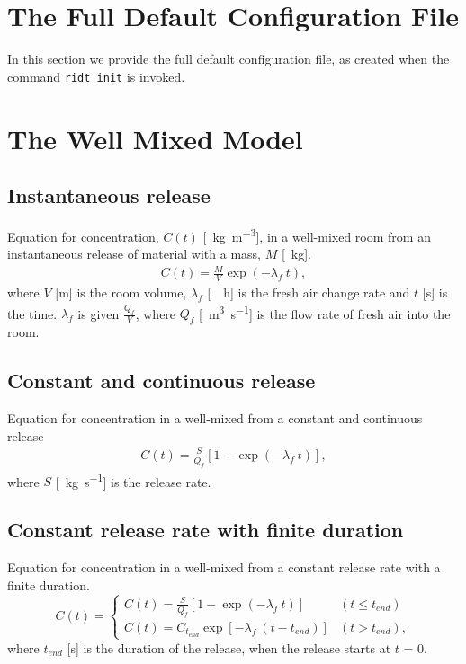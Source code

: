 \documentclass[]{article}
\def\code#1{\texttt{#1}}
\begin{document}
\appendix
\section{The Full Default Configuration File}\label{app:configfile}
In this section we provide the full default configuration file, as created when
the command \code{ridt init} is invoked.



\section{The Well Mixed Model}\label{app:wellmixed}




\subsection{Instantaneous release}\label{sec:WMInst}

Equation for concentration, $C(t)$ [\SI{}{\kilo\gram\per\meter\cubed}], in a
well-mixed room from an instantaneous release of material with a mass, $M$
[\SI{}{\kilo\gram}].
\begin{eqnarray}\label{eq:WMInst}
	C(t) = \frac{M}{V} \exp\left(-\lambda_f\:t\right),
\end{eqnarray}
where $V$ [m] is the room volume, $\lambda_f$ [\SI{}{\per\hour}] is the fresh
air change rate and $t$ [s] is the time. $\lambda_f$ is given $\frac{Q_f}{V}$,
where $Q_f$ [\SI{}{\meter\cubed\per\second}] is the flow rate of fresh air into
the room.
\subsection{Constant and continuous release}\label{sec:WMCont}

Equation for concentration in a well-mixed from a constant and continuous
release \cite{keil09}
\begin{eqnarray}\label{eq:WMCont}
	C(t) = \frac{S}{Q_f} \left[1 - \exp\left( -\lambda_f\:t\right) \right],
\end{eqnarray}
where $S$ [\SI{}{\kilo\gram\per\second}] is the release rate. 

\subsection{Constant release rate with finite duration}\label{sec:WMFinite}

Equation for concentration in a well-mixed from a constant release rate with a
finite duration.
\begin{equation}\label{eq:WMFinite}
	C(t) = 
	\begin{cases} 
		C(t) = \frac{S}{Q_f} \left[1 - \exp\left( -\lambda_f\:t\right) \right]								& (t \leq t_{end}) \\
		C(t) = C_{t_{end}} \exp\left[-\lambda_f\:(t - t_{end})\right]											& (t > t_{end}),
	\end{cases} 
\end{equation}
where $t_{end}$ [s] is the duration of the release, when the release starts at
$t$ = 0.
\end{document}
